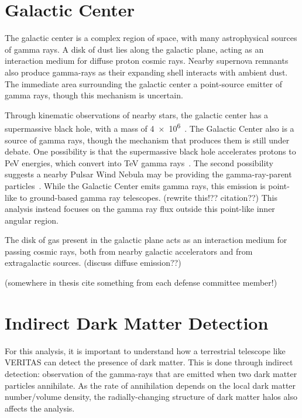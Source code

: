 \section{Galactic Center}

  The galactic center is a complex region of space, with many astrophysical sources of gamma rays.
  A disk of dust lies along the galactic plane, acting as an interaction medium for diffuse proton cosmic rays.
  Nearby supernova remnants also produce gamma-rays as their expanding shell interacts with ambient dust.
  The immediate area surrounding the galactic center a point-source emitter of gamma rays, though this mechanism is uncertain.

  Through kinematic observations of nearby stars, the galactic center has a supermassive black hole, with a mass of \SI{4e6}{\Msol}~\cite{sgra_massdist}.
  The Galactic Center also is a source of \TeV{} gamma rays, though the mechanism that produces them is still under debate.
  One possibility is that the supermassive black hole accelerates protons to PeV energies, which convert into TeV gamma rays~\cite{gc_pevatron}.
  The second possibility suggests a nearby Pulsar Wind Nebula may be providing the gamma-ray-parent particles~\cite{gc_pulsars}.
  While the Galactic Center emits gamma rays, this emission is point-like to ground-based gamma ray telescopes. {\color{red}(rewrite this!?? citation??)}
  This analysis instead focuses on the gamma ray flux outside this point-like inner angular region.

  The disk of gas present in the galactic plane acts as an interaction medium for passing cosmic rays, both from nearby galactic accelerators and from extragalactic sources.
  {\color{red}(discuss diffuse emission??)}

  {\color{red}(somewhere in thesis cite something from each defense committee member!)}

\section{Indirect Dark Matter Detection}
  For this analysis, it is important to understand how a terrestrial telescope like VERITAS can detect the presence of dark matter.
  This is done through indirect detection: observation of the gamma-rays that are emitted when two dark matter particles annihilate.
  As the rate of annihilation depends on the local dark matter number/volume density, the radially-changing structure of dark matter halos also affects the analysis.

